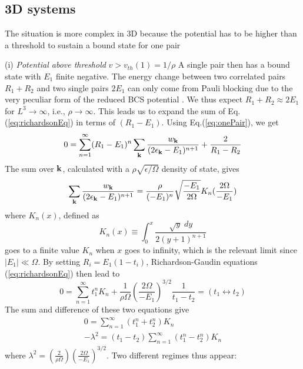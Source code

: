 \documentclass[5p,twocolumn]{elsarticle}
\begin{document}
\subsection{3D systems}

The situation is more complex in 3D because the potential has to be higher than a threshold to sustain a bound state for one pair

(i) {\it Potential above threshold} $v>v_{th}(1)=1/\rho$ A single pair then has a bound state with $E_1$  finite negative. The energy change between two correlated pairs $R_{1}+R_{2}$ and two single pairs  $2E_{1}$ can only come from Pauli blocking due to the very peculiar form of the reduced BCS potential \cite{moth}. We thus expect $R_1+R_2\approx2E_1$ for $L^3\rightarrow\infty$, i.e., $\rho\rightarrow\infty$. This leads us to expand the sum of Eq.(\ref{eq:richardsonEq}) in terms of $(R_{1}-E_{1})$.  Using Eq.(\ref{eq:onePair}), we get
\begin{equation}
0=\sum_{n=1}^{\infty}(R_{1}-E_{1})^{n}\sum_{\mathbf{k}}\frac{w_{\mathbf{k}}}{(2\epsilon_{\mathbf{k}}-E_1)^{n+1}}+\frac{2}{R_1-R_2}
\end{equation}
The sum over $\mathbf{k}$, calculated with a $\rho\sqrt{\epsilon/\Omega}$ density of state, gives
\begin{equation}
\sum_{\mathbf{k}}\frac{w_{\mathbf{k}}}{(2\epsilon_{\mathbf{k}}-E_1)^{n+1}}=\\\frac{\rho}{(-E_{1})^{n}}\sqrt{\frac{-E_{1}}{2\Omega}}K_{n}(\frac{2\Omega}{-E_{1}})
\end{equation}
where $K_{n}(x)$, defined as
\begin{equation}
K_{n}(x)\equiv\int_{0}^{x}\frac{\sqrt{y}\;dy}{2(y+1)^{n+1}}
\end{equation}
goes to a finite value $K_{n}$ when $x$ goes to infinity, which is the relevant limit since $|E_1|\ll\Omega$.
By setting
$R_{i}=E_{1}(1-t_{i})$, Richardson-Gaudin equations (\ref{eq:richardsonEq})  then lead to
\begin{equation}
0=\sum_{n=1}^{\infty}t_{1}^{n}K_{n}+\frac{1}{\rho\Omega}\left(\frac{2\Omega}{-E_{1}}\right)^{3/2}\frac{1}{t_1-t_2}=(t_{1}\leftrightarrow{}t_{2})
\end{equation}
The sum and difference of these two equations give
\begin{gather}
0=\sum_{n=1}^{\infty}(t_{1}^{n}+t_{2}^{n})K_{n}\label{eq:t2}\\
-\lambda^{2}=(t_{1}-t_{2})\sum_{n=1}^{\infty}(t_{1}^{n}-t_{2}^{n})K_{n}\label{eq:t1}
\end{gather}
where $\lambda^2=(\frac{2}{\rho\Omega})(\frac{2\Omega}{-E_{1}})^{3/2}$.
Two different regimes thus appear: 
\end{document}

